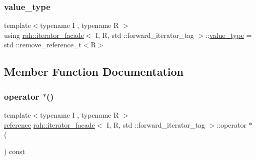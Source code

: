 \subsubsection{\texorpdfstring{value\_type}{value\_type}\hspace{0.1cm}{\footnotesize\ttfamily [2/2]}}
{\footnotesize\ttfamily template$<$typename I , typename R $>$ \\
using \mbox{\hyperlink{structrah_1_1iterator__facade}{rah\+::iterator\+\_\+facade}}$<$ I, R, std \+::forward\+\_\+iterator\+\_\+tag $>$\+::\mbox{\hyperlink{structrah_1_1iterator__facade_3_01_i_00_01_r_00_01std_01_1_1forward__iterator__tag_01_4_a382051259e4c6ce57365cbdd02e6536e}{value\+\_\+type}} =  std \+::remove\+\_\+reference\+\_\+t$<$R$>$}



\subsection{Member Function Documentation}
\mbox{\label{structrah_1_1iterator__facade_3_01_i_00_01_r_00_01std_01_1_1forward__iterator__tag_01_4_afa0ea1baac6413bf9ef210515e0bf14b}} 
\subsubsection{\texorpdfstring{operator $\ast$()}{operator *()}\hspace{0.1cm}{\footnotesize\ttfamily [1/2]}}
{\footnotesize\ttfamily template$<$typename I , typename R $>$ \\
\mbox{\hyperlink{structrah_1_1iterator__facade_3_01_i_00_01_r_00_01std_01_1_1forward__iterator__tag_01_4_afc82a925c7d3fa3959bc9e8fc96dc582}{reference}} \mbox{\hyperlink{structrah_1_1iterator__facade}{rah\+::iterator\+\_\+facade}}$<$ I, R, std \+::forward\+\_\+iterator\+\_\+tag $>$\+::operator $\ast$ (\begin{DoxyParamCaption}{ }\end{DoxyParamCaption}) const\hspace{0.3cm}{\ttfamily [inline]}}

